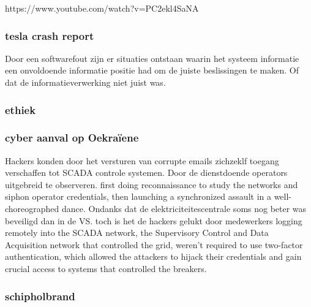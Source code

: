 https://www.youtube.com/watch?v=PC2ekl4SaNA 
\subsubsection{tesla crash report}
Door een softwarefout zijn er situaties ontstaan waarin het systeem informatie een onvoldoende informatie positie had om de juiste beslissingen te maken. Of dat de informatieverwerking niet juist was.



\subsubsection{ethiek}


\subsubsection{ cyber aanval op Oekraïene }


Hackers konden door het versturen van corrupte emails zichzeklf toegang verschaffen tot  SCADA controle systemen. Door de dienstdoende operators uitgebreid te observeren.
first doing reconnaissance to study the networks and siphon operator credentials, then launching a synchronized assault in a well-choreographed dance.
Ondanks dat de elektriciteitescentrale soms nog beter was beveiligd dan in de VS. toch is het de hackers gelukt door medewerkers logging remotely into the SCADA network, the Supervisory Control and Data Acquisition network that controlled the grid, weren't required to use two-factor authentication, which allowed the attackers to hijack their credentials and gain crucial access to systems that controlled the breakers.





\subsubsection{schipholbrand}




